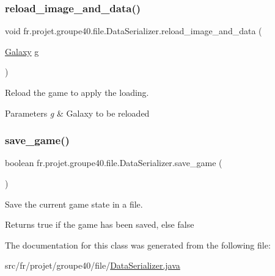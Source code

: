 \subsubsection{\texorpdfstring{reload\+\_\+image\+\_\+and\+\_\+data()}{reload\_image\_and\_data()}}
{\footnotesize\ttfamily void fr.\+projet.\+groupe40.\+file.\+Data\+Serializer.\+reload\+\_\+image\+\_\+and\+\_\+data (\begin{DoxyParamCaption}\item[{\hyperlink{classfr_1_1projet_1_1groupe40_1_1model_1_1board_1_1_galaxy}{Galaxy}}]{g }\end{DoxyParamCaption})}



Reload the game to apply the loading. 


\begin{DoxyParams}{Parameters}
{\em g} & Galaxy to be reloaded \\
\hline
\end{DoxyParams}
\mbox{\label{classfr_1_1projet_1_1groupe40_1_1file_1_1_data_serializer_a6249fd0a2d17a28b616f90ca4fa27667}} 
\subsubsection{\texorpdfstring{save\+\_\+game()}{save\_game()}}
{\footnotesize\ttfamily boolean fr.\+projet.\+groupe40.\+file.\+Data\+Serializer.\+save\+\_\+game (\begin{DoxyParamCaption}{ }\end{DoxyParamCaption})}



Save the current game state in a file. 

\begin{DoxyReturn}{Returns}
true if the game has been saved, else false 
\end{DoxyReturn}


The documentation for this class was generated from the following file\+:\begin{DoxyCompactItemize}
\item 
src/fr/projet/groupe40/file/\hyperlink{_data_serializer_8java}{Data\+Serializer.\+java}\end{DoxyCompactItemize}
